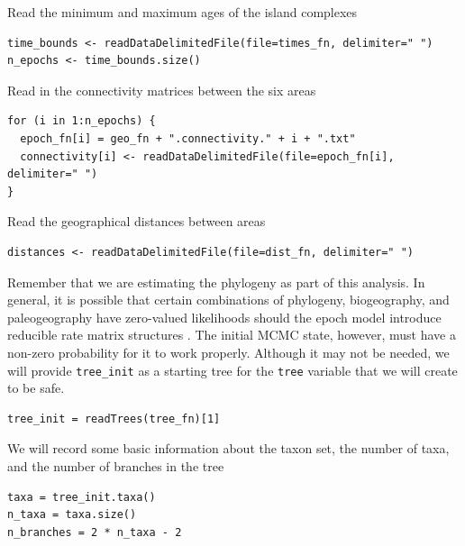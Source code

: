 Read the minimum and maximum ages of the island complexes

\begin{snugshade}
\begin{lstlisting}
time_bounds <- readDataDelimitedFile(file=times_fn, delimiter=" ")
n_epochs <- time_bounds.size()
\end{lstlisting}
\end{snugshade}

Read in the connectivity matrices between the six areas

\begin{snugshade}
\begin{lstlisting}
for (i in 1:n_epochs) {
  epoch_fn[i] = geo_fn + ".connectivity." + i + ".txt"
  connectivity[i] <- readDataDelimitedFile(file=epoch_fn[i], delimiter=" ")
}
\end{lstlisting}
\end{snugshade}

Read the geographical distances between areas

\begin{snugshade}
\begin{lstlisting}
distances <- readDataDelimitedFile(file=dist_fn, delimiter=" ")
\end{lstlisting}
\end{snugshade}

Remember that we are estimating the phylogeny as part of this analysis.
In general, it is possible that certain combinations of phylogeny, biogeography, and paleogeography have zero-valued likelihoods should the epoch model introduce reducible rate matrix structures \citep[][see the supplemental of]{Buerki2011}.
The initial MCMC state, however, must have a non-zero probability for it to work properly.
Although it may not be needed, we will provide {\tt tree\_init} as a starting tree for the {\tt tree} variable that we will create to be safe.

\begin{snugshade}
\begin{lstlisting}
tree_init = readTrees(tree_fn)[1]
\end{lstlisting}
\end{snugshade}

We will record some basic information about the taxon set, the number of taxa, and the number of branches in the tree

\begin{snugshade}
\begin{lstlisting}
taxa = tree_init.taxa()
n_taxa = taxa.size()
n_branches = 2 * n_taxa - 2
\end{lstlisting}
\end{snugshade}

